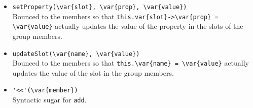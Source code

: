 \begin{itemize}
\item \lstinline|setProperty(\var{slot}, \var{prop}, \var{value})|\\
  Bounced to the members so that
  \lstinline|this.var{slot}->\var{prop} = \var{value}|
  actually updates the value of the property 
  in the slots  of the group members.

\item \lstinline|updateSlot(\var{name}, \var{value})|\\
  Bounced to the members so that
  \lstinline|this.\var{name} = \var{value}|
  actually updates the value of the slot  in
  the group members.

\item \lstinline|'<<'(\var{member})|\\
  Syntactic sugar for \lstinline|add|.
\end{itemize}

